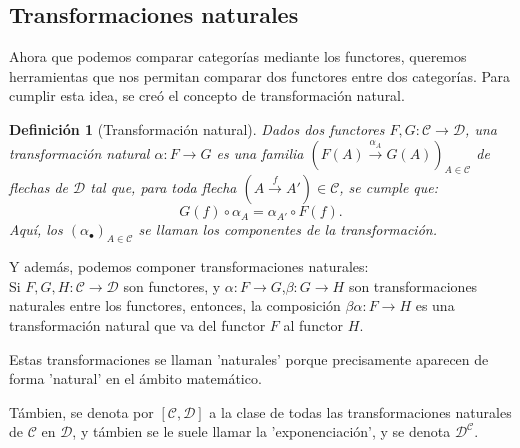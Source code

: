 \documentclass[12pt,letterpaper,titlepage]{article}
\newtheorem*{defn}{Definición}
\theoremstyle{definition}
\newcommand\<{\langle}
\renewcommand\>{\rangle}
\begin{document}
\subsection{Transformaciones naturales}
    Ahora que podemos comparar categorías mediante los functores, queremos herramientas que nos permitan comparar dos functores entre dos categorías. Para cumplir esta idea, se creó el concepto de transformación natural.
    \begin{defn}[Transformación natural]
        Dados dos functores $F,G:\mathcal{C\to D}$, una transformación natural $\alpha:F\to G$ es una familia $(F(A)\overset{\alpha_A}{\to}G(A))_{A\in\mathcal{C}}$ de flechas de $\mathcal{D}$ tal que, para toda flecha $(A\overset{f}{\to}A')\in\mathcal{C}$, se cumple que:
        \begin{equation*}
            G(f)\circ\alpha_A = \alpha_{A'}\circ F(f).
        \end{equation*}
        Aquí, los $(\alpha_\bullet)_{A\in\mathcal{C}}$ se llaman los componentes de la transformación.
    \end{defn}
    Y además, podemos componer transformaciones naturales:\\
    Si $F,G,H:\mathcal{C\to D}$ son functores, y $\alpha:F\to G$,$\beta:G\to H$ son transformaciones naturales entre los functores, entonces, la composición $\beta\alpha:F\to H$ es una transformación natural que va del functor $F$ al functor $H$.
    
    Estas transformaciones se llaman 'naturales' porque precisamente aparecen de forma 'natural' en el ámbito matemático.
    
    Támbien, se denota por $[\mathcal{C,D}]$ a la clase de todas las transformaciones naturales de $\mathcal{C}$ en $\mathcal{D}$, y támbien se le suele llamar la 'exponenciación', y se denota $\mathcal{D^C}$.
    
\end{document}
